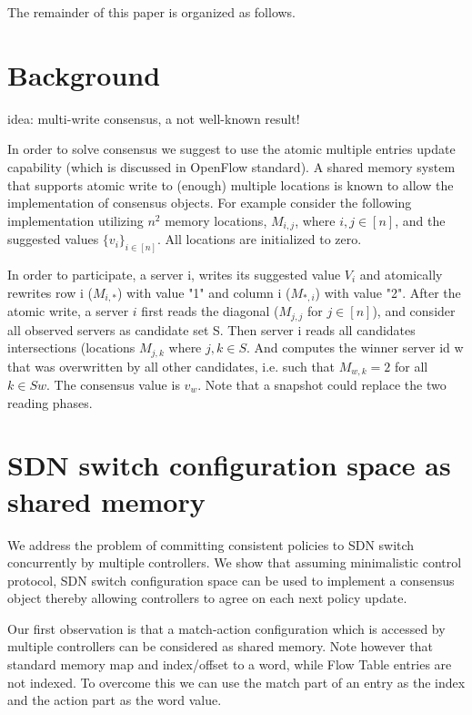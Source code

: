 \documentclass[conference]{sigcomm-alternate}
\begin{document}
The remainder of this paper is organized as follows.

\section{Background}

idea: multi-write consensus, a not well-known result!

In order to solve consensus we suggest to use the atomic multiple entries update capability (which is discussed in OpenFlow standard). A shared memory system that supports atomic write to (enough) multiple locations is known to allow the implementation of consensus objects. For example consider the following implementation utilizing $n^2$ memory locations, $M_{i,j}$, where $i,j\in[n]$, and the suggested values $\{v_i\}_{i\in [n]}$. All locations are initialized to zero.

In order to participate, a server i, writes its suggested value $V_i$ and atomically rewrites row i ($M_{i,*}$) with value "1" and column i ($M_{*,i}$) with value "2". After the atomic write, a server $i$ first reads the diagonal ($M_{j,j}$ for $j\in [n]$), and consider all observed servers as candidate set S.  Then server i reads all candidates intersections (locations $M_{j,k}$ where $j,k\in S$. And computes the winner server id w that was overwritten by all other candidates, i.e. such that $M_{w,k}=2$ for all $k\in S {w}$. The consensus value is $v_w$.
Note that a snapshot could replace the two reading phases.


\section{SDN switch configuration space as shared memory}\label{sec:todo}


We address the problem of committing consistent policies to SDN switch concurrently by multiple controllers.
We show that assuming minimalistic control protocol, SDN switch configuration space can be used to implement a consensus object thereby allowing controllers to agree on each next policy update.

Our first observation is that a match-action configuration which is accessed by multiple controllers can be considered as shared memory. Note however that standard memory map and index/offset to a word, while Flow Table entries are not indexed. To overcome this we can use the match part of an entry as the index and the action part as the word value.
\end{document}

